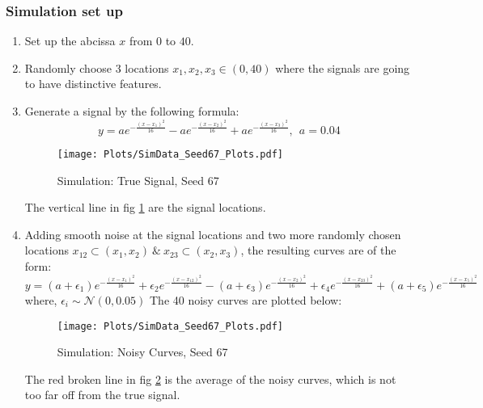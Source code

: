 \subsubsection{Simulation set up}
\begin{enumerate}
\item Set up the abcissa $x$ from $0$ to $40$.

\item Randomly choose 3 locations $x_1, x_2, x_3 \in (0, 40)$ where the signals are going to have distinctive features.

\item Generate a signal by the following formula:
\[ y = ae^{-\frac{(x - x_1)^2}{16}} - ae^{-\frac{(x - x_2)^2}{16}} + ae^{-\frac{(x - x_3)^2}{16}},\ \ a=0.04  \]
\begin{figure}[H]
\begin{center}
\texttt{[image: Plots/SimData\_Seed67\_Plots.pdf]}
\end{center}
\caption{Simulation: True Signal, Seed 67}
\label{fig:FigSim_True}
\end{figure}
The vertical line in fig \ref{fig:FigSim_True} are the signal locations.

\item Adding smooth noise at the signal locations and two more randomly chosen locations $x_{12} \subset (x_1, x_2) \ \& \ x_{23} \subset (x_2, x_3) $, the resulting curves are of the form:
\[ y = (a + \epsilon_1)e^{-\frac{(x - x_1)^2}{16}} + \epsilon_2e^{-\frac{(x - x_12)^2}{16}} - (a + \epsilon_3)e^{-\frac{(x - x_2)^2}{16}} + \epsilon_4e^{-\frac{(x - x_23)^2}{16}} + (a + \epsilon_5)e^{-\frac{(x - x_5)^2}{16}}\]
where, $\epsilon_i \sim \mathcal{N}(0, 0.05)$
The 40 noisy curves are plotted below:
\begin{figure}[H]
\begin{center}
\texttt{[image: Plots/SimData\_Seed67\_Plots.pdf]}
\end{center}
\caption{Simulation: Noisy Curves, Seed 67}
\label{fig:FigSim_Noisy}
\end{figure}
The red broken line in fig \ref{fig:FigSim_Noisy} is the average of the noisy curves, which is not too far off from the true signal. 


\end{enumerate}
